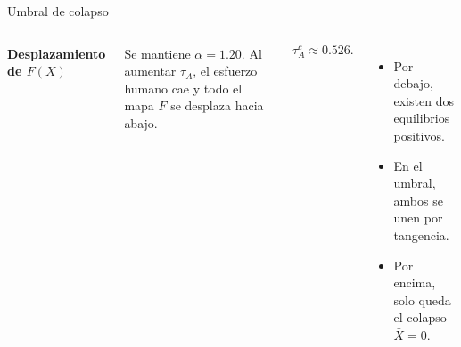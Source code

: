 \documentclas\documentclass[aspectratio=169,11pt]{beamer}
\newcommand{\azul}[1]{\textcolor{AzulMedio}{\textbf{#1}}}
\begin{document}
\begin{frame}{Umbral de colapso}
\begin{columns}[T,onlytextwidth]
\azul{Desplazamiento de $F(X)$}

{\footnotesize Se mantiene $\alpha=1.20$. Al aumentar $\tau_A$, el esfuerzo humano cae y todo el mapa $F$ se desplaza hacia abajo.}

\vspace{0.15cm}
{\normalsize
\[
\tau_A^c\approx0.526.
\]}

\begin{itemize}\scriptsize
  \item Por debajo, existen dos equilibrios positivos.
  \item En el umbral, ambos se unen por tangencia.
  \item Por encima, solo queda el colapso $\bar X=0$.
\end{itemize}
\end{columns}
\end{frame}
\end{document}
